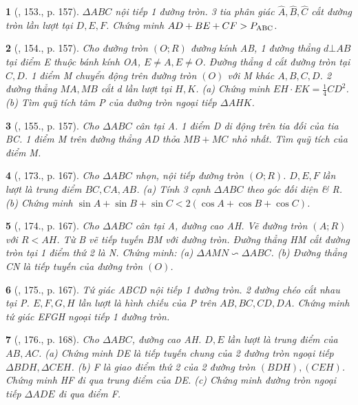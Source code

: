 \documentclass{article}
\newtheorem{baitoan}{}
\begin{document}
\begin{baitoan}[\cite{Tuyen_Toan_9_old}, 153., p. 157]
	$\Delta ABC$ nội tiếp 1 đường tròn. 3 tia phân giác $\widehat{A},\widehat{B},\widehat{C}$ cắt đường tròn lần lượt tại $D,E,F$. Chứng minh $AD + BE + CF > P_{\rm ABC}$.
\end{baitoan}

\begin{baitoan}[\cite{Tuyen_Toan_9_old}, 154., p. 157]
	Cho đường tròn $(O;R)$ đường kính AB, 1 đường thẳng $d\bot AB$ tại điểm E thuộc bánh kính OA, $E\ne A,E\ne O$. Đường thẳng d cắt đường tròn tại $C,D$. 1 điểm M chuyển động trên đường tròn $(O)$ với M khác $A,B,C,D$. 2 đường thẳng $MA,MB$ cắt d lần lượt tại $H,K$. (a) Chứng minh $EH\cdot EK = \frac{1}{4}CD^2$. (b) Tìm quỹ tích tâm P của đường tròn ngoại tiếp $\Delta AHK$.
\end{baitoan}

\begin{baitoan}[\cite{Tuyen_Toan_9_old}, 155., p. 157]
	Cho $\Delta ABC$ cân tại A. 1 điểm D di động trên tia đối của tia BC. 1 điểm M trên đường thẳng AD thỏa $MB + MC$ nhỏ nhất. Tìm quỹ tích của điểm M.
\end{baitoan}

\begin{baitoan}[\cite{Tuyen_Toan_9_old}, 173., p. 167]
	Cho $\Delta ABC$ nhọn, nội tiếp đường tròn $(O;R)$. $D,E,F$ lần lượt là trung điểm $BC,CA,AB$. (a) Tính 3 cạnh $\Delta ABC$ theo góc đối diện \& R. (b) Chứng minh $\sin A + \sin B + \sin C < 2(\cos A + \cos B + \cos C)$.
\end{baitoan}

\begin{baitoan}[\cite{Tuyen_Toan_9_old}, 174., p. 167]
	Cho $\Delta ABC$ cân tại A, đường cao AH. Vẽ đường tròn $(A;R)$ với $R < AH$. Từ B vẽ tiếp tuyến BM với đường tròn. Đường thẳng HM cắt đường tròn tại 1 điểm thứ 2 là N. Chứng minh: (a) $\Delta AMN\backsim\Delta ABC$. (b) Đường thẳng CN là tiếp tuyến của đường tròn $(O)$.
\end{baitoan}

\begin{baitoan}[\cite{Tuyen_Toan_9_old}, 175., p. 167]
	Tứ giác ABCD nội tiếp 1 đường tròn. 2 đường chéo cắt nhau tại P. $E,F,G,H$ lần lượt là hình chiếu của P trên $AB,BC,CD,DA$. Chứng minh tứ giác EFGH ngoại tiếp 1 đường tròn.
\end{baitoan}

\begin{baitoan}[\cite{Tuyen_Toan_9_old}, 176., p. 168]
	Cho $\Delta ABC$, đường cao AH. $D,E$ lần lượt là trung điểm của $AB,AC$. (a) Chứng minh DE là tiếp tuyến chung của 2 đường tròn ngoại tiếp $\Delta BDH,\Delta CEH$. (b) F là giao điểm thứ 2 của 2 đường tròn $(BDH),(CEH)$. Chứng minh HF đi qua trung điểm của DE. (c) Chứng minh đường tròn ngoại tiếp $\Delta ADE$ đi qua điểm F.
\end{baitoan}
\end{document}
